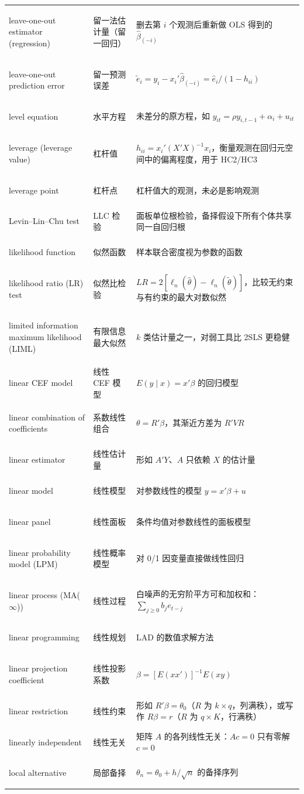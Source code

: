 \begin{longtable}{@{}>{\bfseries\boldmath\raggedright\arraybackslash}p{4.6cm}>{\raggedright\arraybackslash}p{3.2cm}>{\raggedright\arraybackslash}p{\dimexpr\textwidth-7.8cm-4\tabcolsep\relax}@{}}
leave-one-out estimator (regression) & 留一法估计量（留一回归） & 删去第 $i$ 个观测后重新做 OLS 得到的 $\hat\beta_{(-i)}$ \\
leave-one-out prediction error & 留一预测误差 & $\tilde e_i=y_i-x_i'\hat\beta_{(-i)}=\hat e_i/(1-h_{ii})$ \\
level equation & 水平方程 & 未差分的原方程，如 $y_{it}=\rho y_{i,t-1}+\alpha_i+u_{it}$ \\
leverage (leverage value) & 杠杆值 & $h_{ii}=x_i'(X'X)^{-1}x_i$，衡量观测在回归元空间中的偏离程度，用于 HC2/HC3 \\
leverage point & 杠杆点 & 杠杆值大的观测，未必是影响观测 \\
Levin--Lin--Chu test & LLC 检验 & 面板单位根检验，备择假设下所有个体共享同一自回归根 \\
likelihood function & 似然函数 & 样本联合密度视为参数的函数 \\
likelihood ratio (LR) test & 似然比检验 & $LR=2[\ell_n(\hat\theta)-\ell_n(\tilde\theta)]$，比较无约束与有约束的最大对数似然 \\
limited information maximum likelihood (LIML) & 有限信息最大似然 & $k$ 类估计量之一，对弱工具比 2SLS 更稳健 \\
linear CEF model & 线性 CEF 模型 & $E(y\mid x)=x'\beta$ 的回归模型 \\
linear combination of coefficients & 系数线性组合 & $\theta=R'\beta$，其渐近方差为 $R'VR$ \\
linear estimator & 线性估计量 & 形如 $A'Y$、$A$ 只依赖 $X$ 的估计量 \\
linear model & 线性模型 & 对参数线性的模型 $y=x'\beta+u$ \\
linear panel & 线性面板 & 条件均值对参数线性的面板模型 \\
linear probability model (LPM) & 线性概率模型 & 对 0/1 因变量直接做线性回归 \\
linear process (MA($\infty$)) & 线性过程 & 白噪声的无穷阶平方可和加权和：$\sum_{j\ge0}b_je_{t-j}$ \\
linear programming & 线性规划 & LAD 的数值求解方法 \\
linear projection coefficient & 线性投影系数 & $\beta=[E(xx')]^{-1}E(xy)$ \\
linear restriction & 线性约束 & 形如 $R'\beta=\theta_0$（$R$ 为 $k\times q$，列满秩），或写作 $R\beta=r$（$R$ 为 $q\times K$，行满秩） \\
linearly independent & 线性无关 & 矩阵 $A$ 的各列线性无关：$Ac=0$ 只有零解 $c=0$ \\
local alternative & 局部备择 & $\theta_n=\theta_0+h/\sqrt n$ 的备择序列 \\

\end{longtable}
